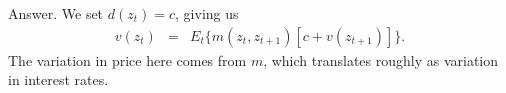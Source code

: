 \documentclass[11pt]{article}
\begin{document}
\begin{enumerate}
Answer.  We set $d(z_t) = c$, giving us
\begin{eqnarray*}
    v(z_t) &=& E_t \big\{ m(z_t,z_{t+1}) [c + v(z_{t+1})] \big\} .
\end{eqnarray*}
The variation in price here comes from $m$, which translates roughly
as variation in interest rates.


\begin{comment}
\item {\it Consols.\/}
A consol is a perpetual bond:  it pays a coupon $c$ every period forever.
How would we value one in an exponential-affine setting?
Consider the pricing kernel
\begin{eqnarray*}
    \log m_{t+1} &=& \delta + z_t + \lambda w_{t+1} \\
    z_{t+1} &=& \varphi z_t + \sigma w_{t+1} ,
\end{eqnarray*}
where $ 0 < \varphi < 1$ and $\{ w_t\} $ is a sequence
of independent standard normal random variables.
As we've seen, this structure gives us loglinear
bond prices:
$ \log q^n(z_t) = A_n + B_n z_t $.
%
\begin{enumerate}
\item Use (\ref{eq:recursion-bond}) to find recursions for the coefficients
$(A_n,B_n)$.
\item Use your answer to find the price of a consol.
\end{enumerate}
{\it Comment about notation\/}:
$m(z_t,z_{t+1})$ is the most accurate notation,
but we (meaning economists in general) often use $m_{t,t+1}$ or $m_{t+1}$
to mean the same.
They're less accurate, but easier to write.

\item {\it Representative agent asset pricing.\/}
(Adapted from an exercise in Ljungqvist and Sargent, {\it Recursive Macroeconomic Theory\/}.)
Consider the representative agent model with additive preferences
\begin{eqnarray*}
    U_t &=& E_t \sum_{n=0}^\infty \beta^n c_{t+n}^{1-\alpha} /(1-\alpha) .
\end{eqnarray*}
The agent's marginal rate of substitution is the pricing kernel,
 $ m_{t+1} = \beta (c_{t+1}/c_t)^{-\alpha} $.

Now suppose the growth rate $g_{t+1} = c_{t+1}/c_t$ follows
\begin{eqnarray*}
    \log g_{t+1} &=& z_t + \theta w_{t+1} \\
    z_{t+1} &=& \varphi z_t + \sigma w_{t+1}
\end{eqnarray*}
with $0 < \varphi < 1$ and $\{ w_t \}$ a sequence of iid standard normal random variables.
%
\begin{enumerate}
\item Bond prices in this economy take the form
$ \log q^n(z_t) = A_n + B_n z_t $.
Use the pricing relation $ q^{n+1}_t = E_t (m_{t+1} q^n_{t+1}) $
to compute recursions for $(A_n,B_n)$.


\end{comment}
\end{enumerate}
\end{document}
